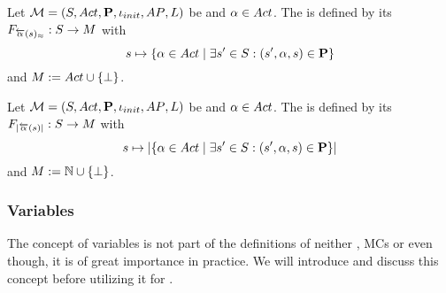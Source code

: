 \documentclass[preview]{standalone}
\begin{document}
\begin{definition}
	Let ${{{\mathcal{M}}}} = {{({S}, {Act}, {\textbf{P}}, {\iota_{init}}, {AP}, {L})}}$ be \achgphN and ${\alpha} \in {Act}$. The \viewN \viewweakinactident is defined by its \grpfctN ${{F_{{\overleftarrow{{\alpha}}}({s})_\approx}}} : {S} \to {\ensuremath{{M}}}$ with
	\[
	{s} \mapsto \{{\alpha} \in {Act} \mid \exists {s}' \in {S} : ({s}', {\alpha}, {s}) \in {\ensuremath{{\textbf{P}}}}\} 	
	\]
	and ${{M}} := {Act}\cup {\{\bot\}}$.
\end{definition}

\begin{definition}
	Let ${{{\mathcal{M}}}} = {{({S}, {Act}, {\textbf{P}}, {\iota_{init}}, {AP}, {L})}}$ be \achgphN and ${\alpha} \in {Act}$. The \viewN \viewinactsetsize is defined by its \grpfctN ${{F_{{|{\overleftarrow{{\alpha}}}({s})|}}}} : {S} \to {\ensuremath{{M}}}$ with
	\[
	{s} \mapsto |\{{\alpha} \in {Act} \mid \exists {s}' \in {S} : ({s}', {\alpha}, {s}) \in {\ensuremath{{\textbf{P}}}}\}|
	\]
	and ${{M}} := {\mathbb{N}} \cup {\{\bot\}}$.
\end{definition}

\subsubsection{Variables}
The concept of variables is not part of the definitions of neither \tsN, MCs or \mdpsN even though, it is of great importance in practice. We will introduce and discuss this concept before utilizing it for \viewsN.
\end{document}
